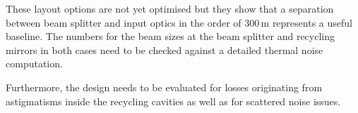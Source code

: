 These layout options are not yet optimised but they show that a separation between beam splitter and input optics in the order of 300\,m represents a useful baseline. The numbers for the beam sizes at the beam splitter and recycling mirrors in both cases need to be checked against a detailed thermal noise computation.

Furthermore, the design needs to be evaluated for losses originating from astigmatisms inside the recycling cavities as well as for scattered noise issues.




